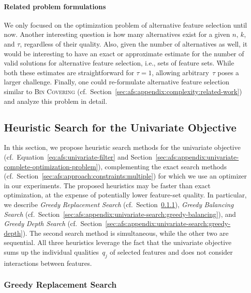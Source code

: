 \documentclass{article}
\theoremstyle{definition}
\begin{document}
\paragraph{Related problem formulations}

We only focused on the optimization problem of alternative feature selection until now.
Another interesting question is how many alternatives exist for a given $n$, $k$, and $\tau$, regardless of their quality.
Also, given the number of alternatives as well, it would be interesting to have an exact or approximate estimate for the number of valid solutions for alternative feature selection, i.e., sets of feature sets.
While both these estimates are straightforward for $\tau = 1$, allowing arbitrary~$\tau$ poses a larger challenge.
Finally, one could re-formulate alternative feature selection similar to \textsc{Bin Covering} (cf.~Section~\ref{sec:afs:appendix:complexity:related-work}) and analyze this problem in detail.

\subsection{Heuristic Search for the Univariate Objective}
\label{sec:afs:appendix:univariate-search}

In this section, we propose heuristic search methods for the univariate objective (cf.~Equation~\ref{eq:afs:univariate-filter} and Section~\ref{sec:afs:appendix:univariate-complete-optimization-problem}), complementing the exact search methods (cf.~Section~\ref{sec:afs:approach:constraints:multiple}) for which we use an optimizer in our experiments.
The proposed heuristics may be faster than exact optimization, at the expense of potentially lower feature-set quality.
In particular, we describe \emph{Greedy Replacement Search} (cf.~Section~\ref{sec:afs:appendix:univariate-search:greedy-replacement}), \emph{Greedy Balancing Search} (cf.~Section~\ref{sec:afs:appendix:univariate-search:greedy-balancing}), and \emph{Greedy Depth Search} (cf.~Section~\ref{sec:afs:appendix:univariate-search:greedy-depth}).
The second search method is simultaneous, while the other two are sequential.
All three heuristics leverage the fact that the univariate objective sums up the individual qualities~$q_j$ of selected features and does not consider interactions between features.

\subsubsection{Greedy Replacement Search}
\label{sec:afs:appendix:univariate-search:greedy-replacement}
\end{document}
